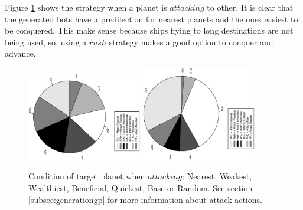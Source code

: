 \documentclass[conference]{IEEEtran}
\begin{document}
Figure \ref{figura:tarta_attacking} shows the strategy when a planet is $attacking$ to other. It is clear that the generated bots have a predilection for nearest planets and the ones easiest to be conquered. This make sense because ships flying to long destinations are not being used, so, using a $ rush$ strategy makes a good option to conquer and advance.
\begin{figure}[htb]
\tiny
\begin{center}

    \includegraphics[trim=1cm 7cm 0cm 7cm, clip=true,width=5cm,angle=-90]{./imags/distribution_initial_attack.eps}
    \includegraphics[trim=1cm 7cm 0cm 7cm, clip=true,width=5cm,angle=-90]{./imags/distribution_final_attack.eps}

\end{center}
\caption{Condition of target planet when $attacking$: Nearest, Weakest, Wealthiest, Beneficial, Quickest, Base or Random. See section \ref{subsec:generationgp} for more information about attack actions.}
\label{figura:tarta_attacking}
\end{figure}
\end{document}
